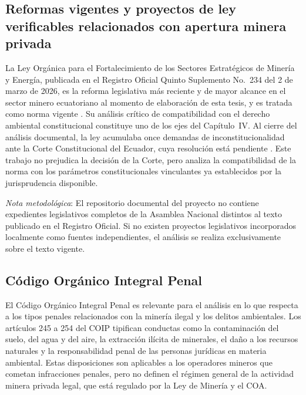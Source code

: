 \subsection{Reformas vigentes y proyectos de ley verificables relacionados con apertura minera privada}

La Ley Orgánica para el Fortalecimiento de los Sectores Estratégicos de Minería y Energía, publicada en el Registro Oficial Quinto Suplemento No.\ 234 del 2 de marzo de 2026, es la reforma legislativa más reciente y de mayor alcance en el sector minero ecuatoriano al momento de elaboración de esta tesis, y es tratada como norma vigente \parencite{ley_fortalecimiento_2026}. Su análisis crítico de compatibilidad con el derecho ambiental constitucional constituye uno de los ejes del Capítulo~IV. Al cierre del análisis documental, la ley acumulaba once demandas de inconstitucionalidad ante la Corte Constitucional del Ecuador, cuya resolución está pendiente \parencite{primicias_demandas_2026}. Este trabajo no prejudica la decisión de la Corte, pero analiza la compatibilidad de la norma con los parámetros constitucionales vinculantes ya establecidos por la jurisprudencia disponible.

\medskip
\noindent\textit{Nota metodológica}: El repositorio documental del proyecto no contiene expedientes legislativos completos de la Asamblea Nacional distintos al texto publicado en el Registro Oficial. Si no existen proyectos legislativos incorporados localmente como fuentes independientes, el análisis se realiza exclusivamente sobre el texto vigente.

\subsection{Código Orgánico Integral Penal}

El Código Orgánico Integral Penal \parencite{coip_2014} es relevante para el análisis en lo que respecta a los tipos penales relacionados con la minería ilegal y los delitos ambientales. Los artículos 245 a 254 del COIP tipifican conductas como la contaminación del suelo, del agua y del aire, la extracción ilícita de minerales, el daño a los recursos naturales y la responsabilidad penal de las personas jurídicas en materia ambiental. Estas disposiciones son aplicables a los operadores mineros que cometan infracciones penales, pero no definen el régimen general de la actividad minera privada legal, que está regulado por la Ley de Minería y el COA.

